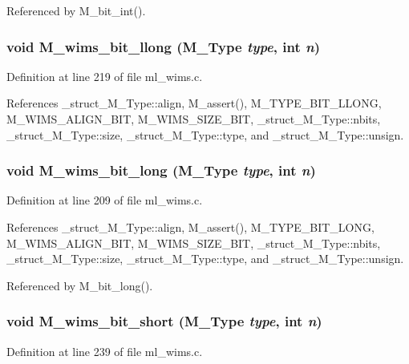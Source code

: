 Referenced by M\_\-bit\_\-int().
\subsubsection{\setlength{\rightskip}{0pt plus 5cm}void M\_\-wims\_\-bit\_\-llong (\bf{M\_\-Type} {\em type}, int {\em n})}\label{ml__wims_8c_dab897a1dc50a1e95b6fdecbd018c07b}




Definition at line 219 of file ml\_\-wims.c.

References \_\-struct\_\-M\_\-Type::align, M\_\-assert(), M\_\-TYPE\_\-BIT\_\-LLONG, M\_\-WIMS\_\-ALIGN\_\-BIT, M\_\-WIMS\_\-SIZE\_\-BIT, \_\-struct\_\-M\_\-Type::nbits, \_\-struct\_\-M\_\-Type::size, \_\-struct\_\-M\_\-Type::type, and \_\-struct\_\-M\_\-Type::unsign.
\subsubsection{\setlength{\rightskip}{0pt plus 5cm}void M\_\-wims\_\-bit\_\-long (\bf{M\_\-Type} {\em type}, int {\em n})}\label{ml__wims_8c_4324396ea231660659caa9bc17416734}




Definition at line 209 of file ml\_\-wims.c.

References \_\-struct\_\-M\_\-Type::align, M\_\-assert(), M\_\-TYPE\_\-BIT\_\-LONG, M\_\-WIMS\_\-ALIGN\_\-BIT, M\_\-WIMS\_\-SIZE\_\-BIT, \_\-struct\_\-M\_\-Type::nbits, \_\-struct\_\-M\_\-Type::size, \_\-struct\_\-M\_\-Type::type, and \_\-struct\_\-M\_\-Type::unsign.

Referenced by M\_\-bit\_\-long().
\subsubsection{\setlength{\rightskip}{0pt plus 5cm}void M\_\-wims\_\-bit\_\-short (\bf{M\_\-Type} {\em type}, int {\em n})}\label{ml__wims_8c_2873a1e517d17841f6b590b42a7fde1e}




Definition at line 239 of file ml\_\-wims.c.

